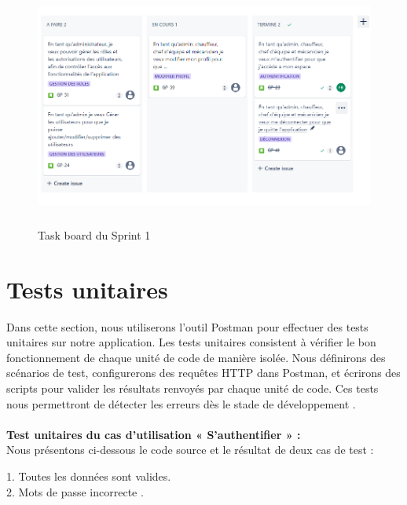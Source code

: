 \begin{figure}[ht!]
  \centering
  \includegraphics[width=1\textwidth, height=8cm]{chap3.images/task board sprint 1.png}
  \caption{ Task board du Sprint 1 }

\end{figure}

\newpage
\section{Tests unitaires}
Dans cette section, nous utiliserons l'outil Postman pour effectuer des tests unitaires sur notre application. Les tests unitaires consistent à vérifier le bon fonctionnement de chaque unité de code de manière isolée. Nous définirons des scénarios de test, configurerons des requêtes HTTP dans Postman, et écrirons des scripts pour valider les résultats renvoyés par chaque unité de code. Ces tests nous permettront de détecter les erreurs dès le stade de développement .\\\\
\bigskip
\textbf{Test unitaires du cas d’utilisation « S'authentifier » :}\\
Nous présentons ci-dessous le code source et le résultat de deux cas de test :

1. Toutes les données sont valides.\\
2. Mots de passe incorrecte .

